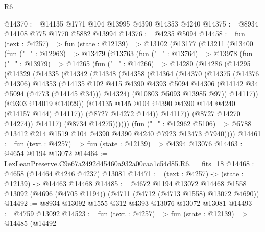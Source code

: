 \begin{lexlean}{R6}
\begin{coremodule}
@14370 := @14135 @1771 @104 @13995 @4390 @14353 @4240
@14375 := @8934 @14108 @775 @1770 @5882 @13994
@14376 := @4235 @5094
@14458 := fun (text : @4257) =>
  fun (state : @12139) =>
  @13102
    (@13177
      (@13211
        (@13400
          (fun ("_" : @12963) =>
          @13479
            (@13763
              (fun ("_" : @13764) =>
              @13978
                (fun ("_" : @13979) =>
                @14265
                  (fun ("_" : @14266) =>
                  @14280
                    (@14286
                      (@14295
                        (@14329
                          (@14335
                            (@14342
                              (@14348
                                (@14358
                                  (@14364
                                    (@14370
                                      (@14375
                                        (@14376 @14306)
                                        @14353
                                        (@14135
                                          @102
                                          @415
                                          @4390
                                          @4393
                                          @5094
                                          @14306
                                          (@14142 @34 @5094 (@4773 (@14145 @34)))
                                          @14324)
                                        (@10803 @5093 @13985 @97))
                                      @14117))
                                  (@9303 @14019 @14029))
                                (@14135 @145 @104 @4390 @4390 @144 @4240 (@14157 @144) @14117))
                              (@8727 @14272 @144))
                            @14117))
                        (@8727 @14270 @14274))
                      @14117)
                    (@8734 @14275))))))
          (fun ("_" : @12962 @5106) =>
          @5788 @13412 @214 @1519 @104 @4390 @4390 @4240 @7923 @13473 @7940))))
@14461 := fun (text : @4257) => fun (state : @12139) => @4394 @13076
@14463 := @4654 @1194 @13072
@14464 := LexLeanPreserve.C9e67a2492d45460a932a00caa1c54d85.R6.__fits_18
@14468 := @4658 (@14464 @4246 @4237) @13081
@14471 := (text : @4257) -> (state : @12139) -> @14463 @14468
@14485 := @4672
    @1194
    @13072
    @14468
    @1558
    @13092
    (@4696 (@4705 @1194))
    (@4711 (@4712 (@4713 @1558) @13072 @4690))
@14492 := @8934 @13092 @1555 @312 @4393 @13076 @13072 @13081
@14493 := @4759 @13092
@14523 := fun (text : @4257) =>
  fun (state : @12139) =>
  @14485
    (@14492

\end{coremodule}
\end{lexlean}
